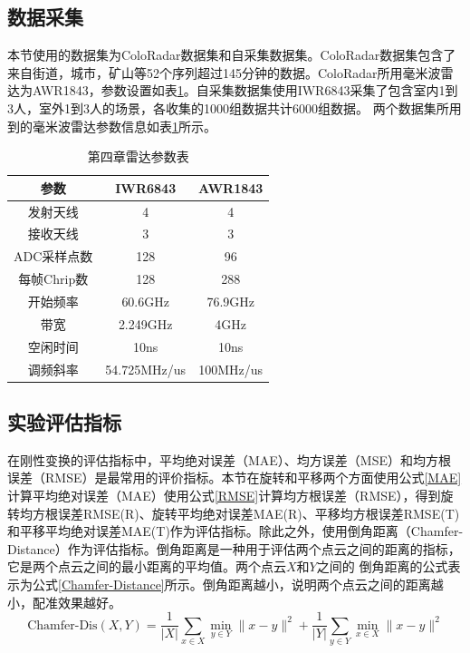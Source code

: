 \subsection{数据采集}
本节使用的数据集为ColoRadar数据集\cite{ColoRadar}和自采集数据集。ColoRadar数据集包含了来自街道，城市，矿山等52个序列超过145分钟的数据。ColoRadar所用毫米波雷达为AWR1843，参数设置如表\ref{第四章雷达参数表}。自采集数据集使用IWR6843采集了包含室内1到3人，室外1到3人的场景，各收集的1000组数据共计6000组数据。
两个数据集所用到的毫米波雷达参数信息如表\ref{第四章雷达参数表}所示。

\begin{table}[htbp]
	\centering
	\tabcolsep=3mm
	\caption{第四章雷达参数表}
	\begin{tabular}{ccc}
		\toprule
		参数 & IWR6843 &AWR1843 \\
		\midrule
		发射天线 & 4 &4 \\
		接收天线 &3 &3  \\
		ADC采样点数 & 128 & 96  \\
		每帧Chrip数 & 128 & 288 \\
		开始频率 &  60.6GHz &  76.9GHz   \\
		带宽 & 2.249GHz &  4GHz  \\
		空闲时间 & 10ns  & 10ns\\
		调频斜率 & 54.725MHz/us& 100MHz/us \\
		\bottomrule
	\end{tabular}
	\label{第四章雷达参数表}
\end{table}

\subsection{实验评估指标}
在刚性变换的评估指标中，平均绝对误差（MAE）、均方误差（MSE）和均方根误差（RMSE）是最常用的评价指标。本节在旋转和平移两个方面使用公式\eqref{MAE}计算平均绝对误差（MAE）使用公式\eqref{RMSE}计算均方根误差（RMSE），得到旋转均方根误差RMSE(R)、旋转平均绝对误差MAE(R)、平移均方根误差RMSE(T)和平移平均绝对误差MAE(T)作为评估指标。除此之外，使用倒角距离（Chamfer-Distance）作为评估指标。倒角距离是一种用于评估两个点云之间的距离的指标，它是两个点云之间的最小距离的平均值。两个点云$X$和$Y$之间的
倒角距离的公式表示为公式\eqref{Chamfer-Distance}所示。倒角距离越小，说明两个点云之间的距离越小，配准效果越好。
\begin{equation}
	\label{Chamfer-Distance}
	\text{Chamfer-Dis}(X,Y) = \frac{1}{|X|} \sum_{x \in X} \min_{y \in Y} \|x - y \|^2 + \frac{1}{|Y|} \sum_{y \in Y} \min_{x \in X} \|x - y \|^2 
\end{equation}
